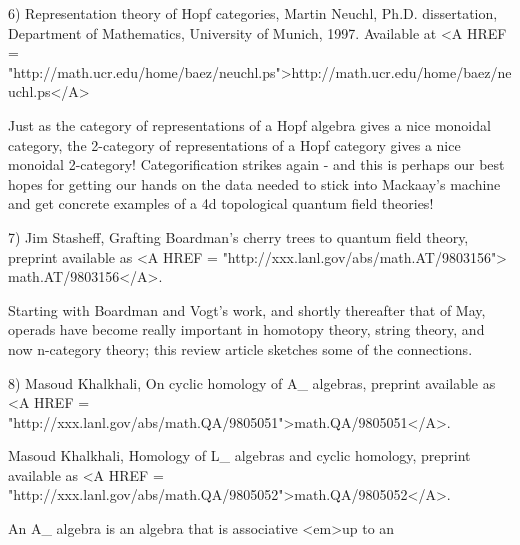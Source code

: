 6) Representation theory of Hopf categories, Martin Neuchl, Ph.D.
dissertation, Department of Mathematics, University of Munich,
1997.   Available at <A HREF = "http://math.ucr.edu/home/baez/neuchl.ps">http://math.ucr.edu/home/baez/neuchl.ps</A>

Just as the category of representations of a Hopf algebra gives a nice
monoidal category, the 2-category of representations of a Hopf category
gives a nice monoidal 2-category!  Categorification strikes again - and
this is perhaps our best hopes for getting our hands on the data needed
to stick into Mackaay's machine and get concrete examples of a 4d topological
quantum field theories!

7) Jim Stasheff, Grafting Boardman's cherry trees to quantum field theory,
preprint available as <A HREF = "http://xxx.lanl.gov/abs/math.AT/9803156">
math.AT/9803156</A>.


Starting with Boardman and Vogt's work, and shortly thereafter that of
May, operads have become really important in homotopy theory, string
theory, and now n-category theory; this review article sketches some 
of the connections.

8) Masoud Khalkhali, On cyclic homology of A_{\infty } 
algebras, preprint 
available 
as <A HREF = "http://xxx.lanl.gov/abs/math.QA/9805051">math.QA/9805051</A>.
 
Masoud Khalkhali, Homology of L_{\infty } algebras and cyclic homology,
preprint available 
as <A HREF = "http://xxx.lanl.gov/abs/math.QA/9805052">math.QA/9805052</A>.

An A_{\infty } algebra is an algebra that is associative <em>up to an


